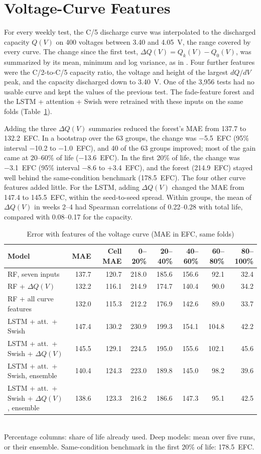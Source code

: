 \documentclass[conference]{IEEEtran}
\begin{document}
\clearpage
\section{Voltage-Curve Features}
\label{app:curve}
For every weekly test, the C/5 discharge curve was interpolated to the discharged capacity $Q(V)$ on 400 voltages between 3.40 and 4.05~V, the range covered by every curve. The change since the first test, $\Delta Q(V) = Q_k(V) - Q_0(V)$, was summarized by its mean, minimum and log variance, as in \cite{severson2019}. Four further features were the C/2-to-C/5 capacity ratio, the voltage and height of the largest $dQ/dV$ peak, and the capacity discharged down to 3.40~V. One of the 3,956 tests had no usable curve and kept the values of the previous test. The fade-feature forest and the LSTM + attention + Swish were retrained with these inputs on the same folds (Table~\ref{tab:curve}).

Adding the three $\Delta Q(V)$ summaries reduced the forest's MAE from 137.7 to 132.2~EFC. In a bootstrap over the 63 groups, the change was −5.5~EFC (95\% interval −10.2 to −1.0~EFC), and 40 of the 63 groups improved; most of the gain came at 20--60\% of life (−13.6~EFC). In the first 20\% of life, the change was −3.1~EFC (95\% interval −8.6 to +3.4~EFC), and the forest (214.9~EFC) stayed well behind the same-condition benchmark (178.5~EFC). The four other curve features added little. For the LSTM, adding $\Delta Q(V)$ changed the MAE from 147.4 to 145.5~EFC, within the seed-to-seed spread. Within groups, the mean of $\Delta Q(V)$ in weeks 2--4 had Spearman correlations of 0.22--0.28 with total life, compared with 0.08--0.17 for the capacity.

\begin{table}[h]
\centering
\caption{Error with features of the voltage curve (MAE in EFC, same folds)}
\label{tab:curve}
\footnotesize
\begin{tabular}{@{}lrrrrrrr@{}}
\toprule
Model & MAE & Cell MAE & 0--20\% & 20--40\% & 40--60\% & 60--80\% & 80--100\% \\
\midrule
RF, seven inputs & 137.7 & 120.7 & 218.0 & 185.6 & 156.6 & 92.1 & 32.4 \\
RF + $\Delta Q(V)$ & 132.2 & 116.1 & 214.9 & 174.7 & 140.4 & 90.0 & 34.2 \\
RF + all curve features & 132.0 & 115.3 & 212.2 & 176.9 & 142.6 & 89.0 & 33.7 \\
LSTM + att.\ + Swish & 147.4 & 130.2 & 230.9 & 199.3 & 154.1 & 104.8 & 42.2 \\
LSTM + att.\ + Swish + $\Delta Q(V)$ & 145.5 & 129.1 & 224.5 & 195.0 & 155.6 & 102.1 & 45.6 \\
LSTM + att.\ + Swish, ensemble & 140.4 & 124.3 & 223.0 & 189.8 & 145.0 & 98.2 & 39.6 \\
LSTM + att.\ + Swish + $\Delta Q(V)$, ensemble & 138.6 & 123.3 & 216.2 & 186.6 & 147.3 & 95.1 & 42.5 \\
\bottomrule
\end{tabular}
\\[2pt]
Percentage columns: share of life already used. Deep models: mean over five runs, or their ensemble. Same-condition benchmark in the first 20\% of life: 178.5~EFC.
\end{table}
\end{document}
